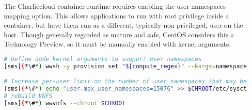 The Charliecloud container runtime requires enabling the user namespaces mapping
option. This allows applications to run with root privilege inside a container, 
but have them run as a different, typically non-privileged, user on the host.
Though generally regarded as mature and safe, CentOS considers this a Technology
Preview, so it must be manually enabled with kernel arguments.

\begin{lstlisting}[language=bash,keywords={},upquote=true]
# Define node kernel arguments to support user namespaces
[sms](*\#*) wwsh -y provision set "${compute_regex}" --kargs=namespace.unpriv_enable=1

# Increase per-user limit on the number of user namespaces that may be created
[sms](*\#*) echo "user.max_user_namespaces=15076" >> $CHROOT/etc/sysctl.conf
# rebuild VNFS
[sms](*\#*) wwvnfs --chroot $CHROOT
\end{lstlisting}
